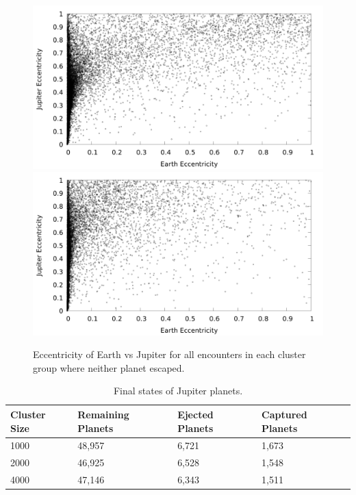 \documentclass[12pt]{article}
\begin{document}
    \begin{figure}[H]
        \caption{Eccentricity of Earth vs Jupiter for all encounters
            in each cluster group where neither planet escaped.
        }
        \centering
        \includegraphics[width=5in]{evj_ecc_earth_jupiter_1000} 
        \includegraphics[width=5in]{evj_ecc_earth_jupiter_4000} 
    \end{figure}

    \begin{table}[H]
        \centering
        \caption{Final states of Jupiter planets.
        }
        \begin{tabular}{|llll|}
            \hline
            \textbf{Cluster Size} & \textbf{Remaining Planets} & \textbf{Ejected Planets} & \textbf{Captured Planets} \\
            \hline
            1000 & 48,957 & 6,721 & 1,673 \\
            2000 & 46,925 & 6,528 & 1,548 \\
            4000 & 47,146 & 6,343 & 1,511 \\
            \hline
        \end{tabular}
    \end{table}
\end{document}
